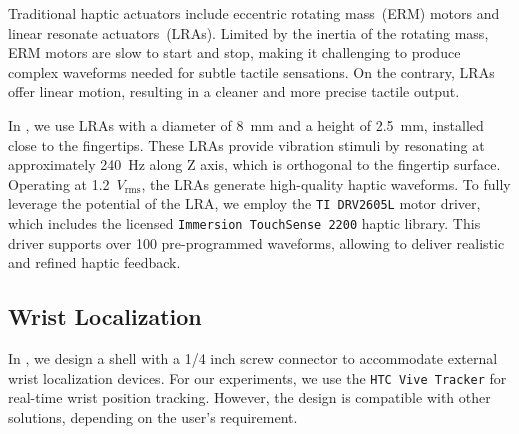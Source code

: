 Traditional haptic actuators include eccentric rotating mass~(ERM) motors and linear resonate actuators~(LRAs). Limited by the inertia of the rotating mass, ERM motors are slow to start and stop, making it challenging to produce complex waveforms needed for subtle tactile sensations. On the contrary, LRAs offer linear motion, resulting in a cleaner and more precise tactile output.

In \oursystem, we use LRAs with a diameter of 8~mm and a height of 2.5~mm, installed close to the fingertips. These LRAs provide vibration stimuli by resonating at approximately 240~Hz along Z axis, which is orthogonal to the fingertip surface. Operating at 1.2~$V_\mathrm{rms}$, the LRAs generate high-quality haptic waveforms. To fully leverage the potential of the LRA, we employ the \texttt{TI DRV2605L} motor driver, which includes the licensed \texttt{Immersion TouchSense\textsuperscript{\textcopyright} 2200} haptic library. This driver supports over 100 pre-programmed waveforms, allowing \oursystem to deliver realistic and refined haptic feedback.

\subsection{Wrist Localization}

In \oursystem, we design a shell with a 1/4 inch screw connector to accommodate external wrist localization devices. For our experiments, we use the \texttt{HTC Vive Tracker} for real-time wrist position tracking. However, the design is compatible with other solutions, depending on the user's requirement.
